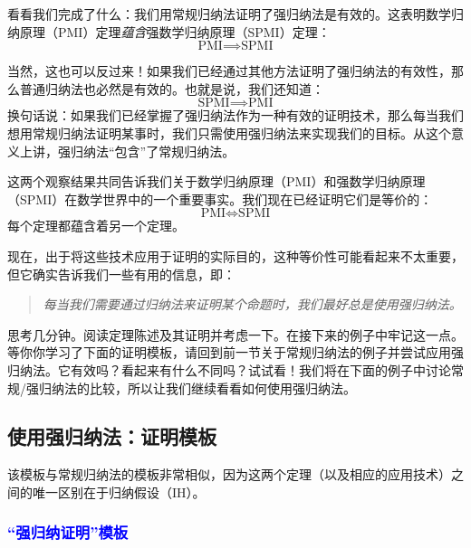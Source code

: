 看看我们完成了什么：我们用常规归纳法证明了强归纳法是有效的。这表明数学归纳原理（PMI）定理\emph{蕴含}强数学归纳原理（SPMI）定理：
\[\text{PMI} \implies \text{SPMI}\]

当然，这也可以反过来！如果我们已经通过其他方法证明了强归纳法的有效性，那么普通归纳法也必然是有效的。也就是说，我们还知道：
\[\text{SPMI} \implies \text{PMI}\]
换句话说：如果我们已经掌握了强归纳法作为一种有效的证明技术，那么每当我们想用常规归纳法证明某事时，我们只需使用强归纳法来实现我们的目标。从这个意义上讲，强归纳法``包含''了常规归纳法。

这两个观察结果共同告诉我们关于数学归纳原理（PMI）和强数学归纳原理（SPMI）在数学世界中的一个重要事实。我们现在已经证明它们是等价的：
\[\text{PMI} \iff \text{SPMI}\]
每个定理都蕴含着另一个定理。

现在，出于将这些技术应用于证明的实际目的，这种等价性可能看起来不太重要，但它确实告诉我们一些有用的信息，即：
\begin{quotation}
    \emph{每当我们需要通过归纳法来证明某个命题时，我们最好总是使用强归纳法。}
\end{quotation}

思考几分钟。阅读定理陈述及其证明并考虑一下。在接下来的例子中牢记这一点。等你你学习了下面的证明模板，请回到前一节关于常规归纳法的例子并尝试应用强归纳法。它有效吗？看起来有什么不同吗？试试看！我们将在下面的例子中讨论常规/强归纳法的比较，所以让我们继续看看如何使用强归纳法。

\subsection{使用强归纳法：证明模板}

该模板与常规归纳法的模板非常相似，因为这两个定理（以及相应的应用技术）之间的唯一区别在于归纳假设（IH）。

\subsubsection*{\textcolor{blue}{``强归纳证明''模板}}

\setlength{\fboxrule}{2pt}
\setlength\fboxsep{5mm}
\begin{center}
\noindent {}
\end{center}

